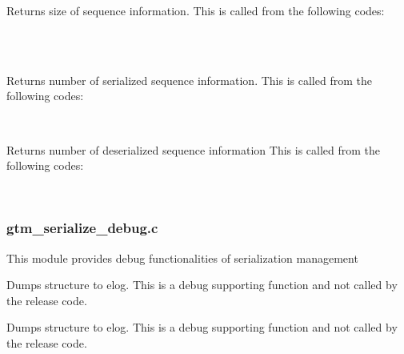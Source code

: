 	Returns size of sequence information.
	This is called from the following codes:
	
	\FuncRefHdr
	  \\
	  \\ \hline
	\FuncRefTrailor
  
  
	Returns number of serialized sequence information.
	This is called from the following codes:
	
	\FuncRefHdr
	  \\ \hline
	\FuncRefTrailor
  
  
	Returns number of deserialized sequence information
	This is called from the following codes:
	
	\FuncRefHdr
	  \\ \hline
	\FuncRefTrailor
  


\subsubsection{gtm\_serialize\_debug.c}
  
  This module provides debug functionalities of serialization management
  
  
	Dumps  structure to elog.
	This is a debug supporting function and not called by the release code.
  
  
	Dumps  structure to elog.
	This is a debug supporting function and not called by the release code.



